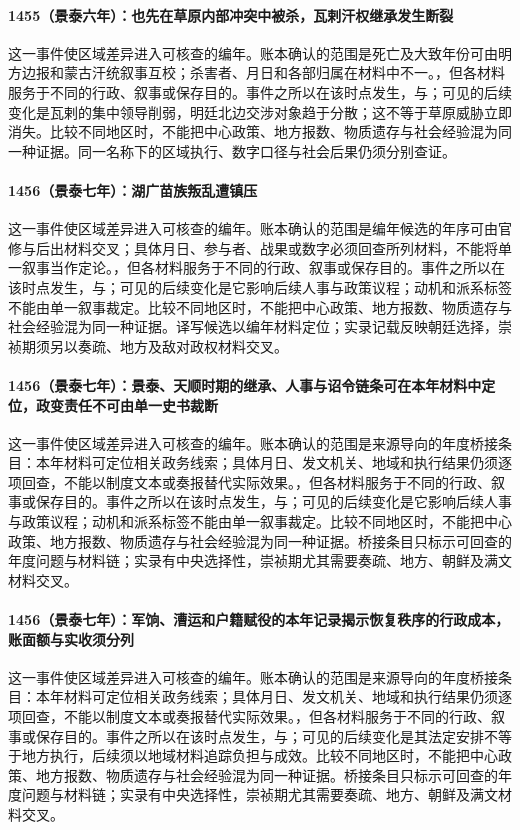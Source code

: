 \paragraph{1455（景泰六年）：也先在草原内部冲突中被杀，瓦剌汗权继承发生断裂} 这一事件使区域差异进入可核查的编年。账本确认的范围是死亡及大致年份可由明方边报和蒙古汗统叙事互校；杀害者、月日和各部归属在材料中不一。，但各材料服务于不同的行政、叙事或保存目的。事件之所以在该时点发生，与；可见的后续变化是瓦剌的集中领导削弱，明廷北边交涉对象趋于分散；这不等于草原威胁立即消失。比较不同地区时，不能把中心政策、地方报数、物质遗存与社会经验混为同一种证据。同一名称下的区域执行、数字口径与社会后果仍须分别查证。

\paragraph{1456（景泰七年）：湖广苗族叛乱遭镇压} 这一事件使区域差异进入可核查的编年。账本确认的范围是编年候选的年序可由官修与后出材料交叉；具体月日、参与者、战果或数字必须回查所列材料，不能将单一叙事当作定论。，但各材料服务于不同的行政、叙事或保存目的。事件之所以在该时点发生，与；可见的后续变化是它影响后续人事与政策议程；动机和派系标签不能由单一叙事裁定。比较不同地区时，不能把中心政策、地方报数、物质遗存与社会经验混为同一种证据。译写候选以编年材料定位；实录记载反映朝廷选择，崇祯期须另以奏疏、地方及敌对政权材料交叉。

\paragraph{1456（景泰七年）：景泰、天顺时期的继承、人事与诏令链条可在本年材料中定位，政变责任不可由单一史书裁断} 这一事件使区域差异进入可核查的编年。账本确认的范围是来源导向的年度桥接条目：本年材料可定位相关政务线索；具体月日、发文机关、地域和执行结果仍须逐项回查，不能以制度文本或奏报替代实际效果。，但各材料服务于不同的行政、叙事或保存目的。事件之所以在该时点发生，与；可见的后续变化是它影响后续人事与政策议程；动机和派系标签不能由单一叙事裁定。比较不同地区时，不能把中心政策、地方报数、物质遗存与社会经验混为同一种证据。桥接条目只标示可回查的年度问题与材料链；实录有中央选择性，崇祯期尤其需要奏疏、地方、朝鲜及满文材料交叉。

\paragraph{1456（景泰七年）：军饷、漕运和户籍赋役的本年记录揭示恢复秩序的行政成本，账面额与实收须分列} 这一事件使区域差异进入可核查的编年。账本确认的范围是来源导向的年度桥接条目：本年材料可定位相关政务线索；具体月日、发文机关、地域和执行结果仍须逐项回查，不能以制度文本或奏报替代实际效果。，但各材料服务于不同的行政、叙事或保存目的。事件之所以在该时点发生，与；可见的后续变化是其法定安排不等于地方执行，后续须以地域材料追踪负担与成效。比较不同地区时，不能把中心政策、地方报数、物质遗存与社会经验混为同一种证据。桥接条目只标示可回查的年度问题与材料链；实录有中央选择性，崇祯期尤其需要奏疏、地方、朝鲜及满文材料交叉。

